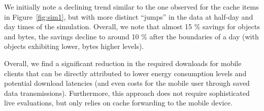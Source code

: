 \documentclass[letterpaper,conference]{IEEEtran}
\begin{document}
We initially note a declining trend similar to the one observed for the cache items in Figure~\ref{fig:sim1}, but with more distinct ``jumps'' in the data at half-day and day times of the simulation.
Overall, we note that almost 15 \% savings for objects and bytes, the savings decline to around 10 \% after the boundaries of a day (with objects exhibiting lower, bytes higher levels).


%

%
Overall, we find a significant reduction in the required downloads for mobile clients that can be directly attributed to lower energy consumption levels and potential download latencies (and even costs for the mobile user through saved data transmissions).
Furthermore, this approach does not require sophisticated live evaluations, but only relies on cache forwarding to the mobile device.
\end{document}
